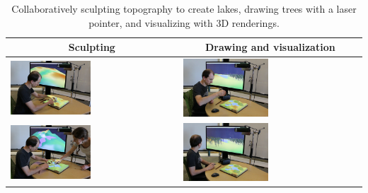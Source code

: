 \documentclass[Afour,sageh,times]{sagej}
\newcommand{\ra}[1]{\renewcommand{\arraystretch}{#1}}
\begin{document}
\begin{table}
\caption{Collaboratively sculpting topography to create lakes, drawing trees with a laser pointer, and visualizing with 3D renderings.} %
\ra{1.3}
\begin{tabular}{m{} m{}}
\toprule
\multicolumn{1}{c}{Sculpting}  & \multicolumn{1}{c}{Drawing and visualization}\\
\midrule
%
\includegraphics[width=0.49\textwidth]{images/immersive/sculpting_lakes_2.png} &
\includegraphics[width=0.49\textwidth]{images/immersive/drawing_trees_1.png}\\
%
\includegraphics[width=0.49\textwidth]{images/immersive/sculpting_landforms_2.png} &
\includegraphics[width=0.49\textwidth]{images/immersive/drawing_trees_2.png}\\

\end{tabular}
\end{table}
\end{document}
